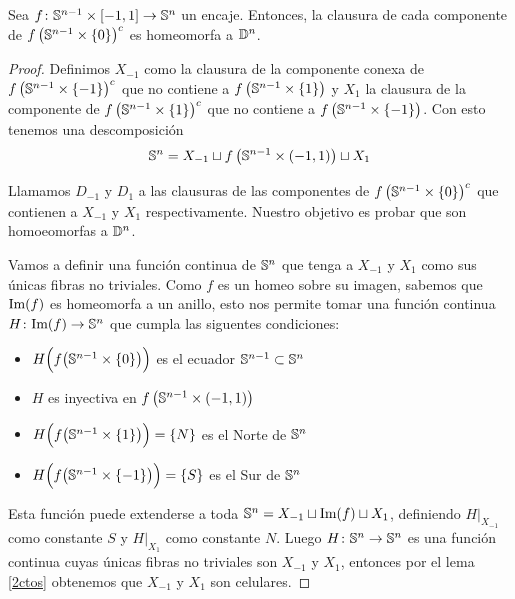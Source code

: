 
\begin{teo}\label{remate}
    Sea $f\colon\mathbb{S}^{n-1}\times [-1,1]\to\mathbb{S}^n$ un encaje. Entonces, la clausura de cada componente de $f\left(\mathbb{S}^{n-1}\times \{0\}\right)^c$ es homeomorfa a $\mathbb{D}^n$.
\end{teo}
\begin{proof}

    Definimos $X_{-1}$ como la clausura de la componente conexa de $f\left(\mathbb{S}^{n-1}\times \{-1\}\right)^c$ que no contiene a $f\left(\mathbb{S}^{n-1}\times \{1\}\right)$ y $X_1$ la clausura de la componente de $f\left(\mathbb{S}^{n-1}\times \{1\}\right)^c$ que no contiene a $f\left(\mathbb{S}^{n-1}\times \{-1\}\right)$. Con esto tenemos una descomposición $$\mathbb{S}^n=X_{-1}\sqcup f\left(\mathbb{S}^{n-1}\times(-1,1)\right)\sqcup X_1$$

    Llamamos $D_{-1}$ y $D_1$ a las clausuras de las componentes de $f\left(\mathbb{S}^{n-1}\times \{0\}\right)^c$ que contienen a $X_{-1}$ y $X_1$ respectivamente. Nuestro objetivo es probar que son homoeomorfas a $\mathbb{D}^n$. 
    
    Vamos a definir una función continua de $\mathbb{S}^n$ que tenga a $X_{-1}$ y $X_1$ como sus únicas fibras no triviales. Como $f$ es un homeo sobre su imagen, sabemos que $\text{Im}(f)$ es homeomorfa a un anillo, esto nos permite tomar una función continua $H\colon \text{Im}(f)\to\mathbb{S}^n$ que cumpla las siguentes condiciones:\begin{itemize}
    \item $ H\Big(f\big(\mathbb{S}^{n-1}\times \{0\}\big)\Big)$ es el ecuador $\mathbb{S}^{n-1}\subset\mathbb{S}^n$
    \item $H$ es inyectiva en $f\left(\mathbb{S}^{n-1}\times(-1,1)\right)$
    \item $ H\Big(f\big(\mathbb{S}^{n-1}\times \{1\}\big)\Big)=\{N\}$ es el Norte de $\mathbb{S}^n$
    \item $ H\Big(f\big(\mathbb{S}^{n-1}\times \{-1\}\big)\Big)=\{S\}$ es el Sur de $\mathbb{S}^n$
    \end{itemize}

    Esta función puede extenderse a toda $\mathbb{S}^n=X_{-1}\sqcup\text{Im}(f)\sqcup X_1$, definiendo $H|_{X_{-1}}$ como constante $S$ y $H|_{X_1}$ como constante $N$. Luego $H\colon\mathbb{S}^n\to\mathbb{S}^n$ es una función continua cuyas únicas fibras no triviales son $X_{-1}$ y $X_1$, entonces por el lema \ref{2ctos} obtenemos que $X_{-1}$ y $X_1$ son celulares.



\end{proof}
